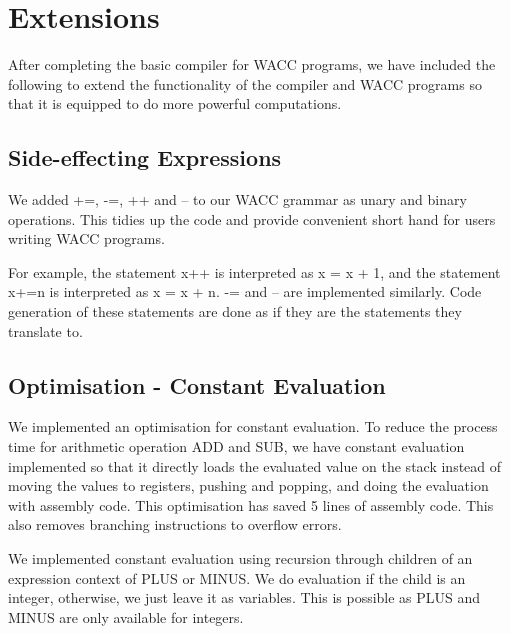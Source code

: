 \documentclass[a4paper]{article}
\theoremstyle{definition}
\begin{document}
\section{Extensions}
After completing the basic compiler for WACC programs, we have included the following to extend the functionality of the compiler and WACC programs so that it is equipped to do more powerful computations.

\subsection{Side-effecting Expressions}
We added +=, -=, ++ and -- to our WACC grammar as unary and binary operations. This tidies up the code and provide convenient short hand for users writing WACC programs.

For example, the statement x++ is interpreted as x = x + 1, and the statement x+=n is interpreted as x = x + n. -= and -- are implemented similarly. Code generation of these statements are done as if they are the statements they translate to.

\subsection{Optimisation - Constant Evaluation}
We implemented an optimisation for constant evaluation. To reduce the process time for arithmetic operation ADD and SUB, we have constant evaluation implemented so that it directly loads the evaluated value on the stack instead of moving the values to registers, pushing and popping, and doing the evaluation with assembly code. This optimisation has saved 5 lines of assembly code. This also removes branching instructions to overflow errors.

We implemented constant evaluation using recursion through children of an expression context of PLUS or MINUS. We do evaluation if the child is an integer, otherwise, we just leave it as variables. This is possible as PLUS and MINUS are only available for integers.
\end{document}
